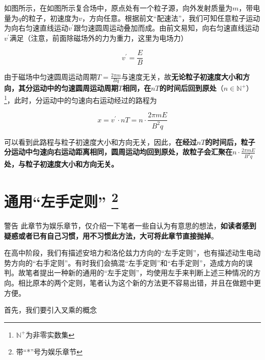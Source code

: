 

如图所示，在如图所示复合场中，原点处有一个粒子源，向外发射质量为$m$，带电量为$q$的粒子，初速度为$v$，方向任意。根据前文“配速法”，我们可知任意粒子运动为向右匀速直线运动$v^{\prime}$跟匀速圆周运动叠加而成。由前文易知，向右匀速直线运动$v^{\prime}$满足（注意，前面除磁场外的力为重力，这里为电场力）

$$v^{\prime} = \frac{E}{B}$$

由于磁场中匀速圆周运动周期$T = \frac{2 \pi m}{Bq}$与速度无关，故\textbf{无论粒子初速度大小和方向，其分运动中的匀速圆周运动周期$T$相同，在$n T$的时间后回到原处}（$n \in \mathbb{N^{+}}$）\footnote{$\mathbb{N^{+}}$为非零实数集}，此时，分运动中的匀速向右运动经过的路程为

$$x = v^{\prime} \cdot n T = n \cdot \frac{2 \pi m E}{B^2 q}$$

可以看到此路程与粒子初速度大小和方向无关，因此，\textbf{在经过$nT$的时间后，粒子分运动中匀速向右运动距离相同，圆周运动均回到原处，故粒子会汇聚在$n \cdot \frac{2 \pi m E}{B^2 q}$处，与粒子初速度大小和方向无关。}

\section{通用“左手定则” \quad * \protect \footnote{带“*”号为娱乐章节}}


\label{s_tyzsdz}

\begin{mk}{警告}{}
此章节为娱乐章节，仅介绍一下笔者一些自认为有意思的想法，\textbf{如读者感到疑惑或者已有自己习惯，用不习惯此方法，大可将此章节直接抛掉}。
\end{mk}

在高中阶段，我们有描述安培力和洛伦兹力方向的“左手定则”，也有描述动生电动势方向的“右手定则”。有时我们会搞混“左手定则”和“右手定则”，造成方向的误判。故笔者提出一种新的通用的“左手定则”，均使用左手来判断上述三种情况的方向。相比原本的两个定则，笔者认为这个新的方法更不容易出错，并且在做题中更方便。

首先，我们要引入叉乘的概念

